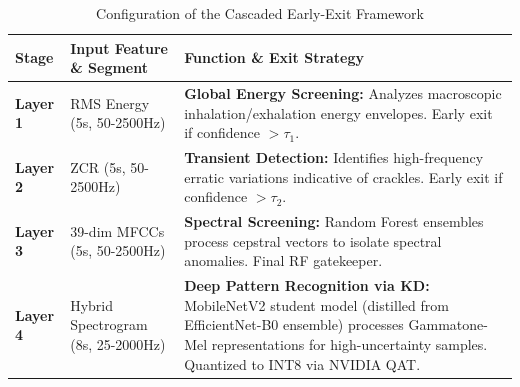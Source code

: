 \begin{table}[h]
    \centering
    \caption{Configuration of the Cascaded Early-Exit Framework}
    \label{tab:framework_config}
    \small
    \renewcommand{\arraystretch}{1.2}
    \begin{tabular}{@{}llp{8.5cm}@{}} %
        \toprule
        \textbf{Stage} & \textbf{Input Feature \& Segment} & \textbf{Function \& Exit Strategy} \\
        \midrule
        \textbf{Layer 1} & RMS Energy (5s, 50-2500Hz) & \textbf{Global Energy Screening:} Analyzes macroscopic inhalation/exhalation energy envelopes. Early exit if confidence $> \tau_1$. \\
        \textbf{Layer 2} & ZCR (5s, 50-2500Hz) & \textbf{Transient Detection:} Identifies high-frequency erratic variations indicative of crackles. Early exit if confidence $> \tau_2$. \\
        \textbf{Layer 3} & 39-dim MFCCs (5s, 50-2500Hz) & \textbf{Spectral Screening:} Random Forest ensembles process cepstral vectors to isolate spectral anomalies. Final RF gatekeeper. \\
        \textbf{Layer 4} & Hybrid Spectrogram (8s, 25-2000Hz) & \textbf{Deep Pattern Recognition via KD:} MobileNetV2 student model (distilled from EfficientNet-B0 ensemble) processes Gammatone-Mel representations for high-uncertainty samples. Quantized to INT8 via NVIDIA QAT. \\
        \bottomrule
    \end{tabular}
\end{table}
